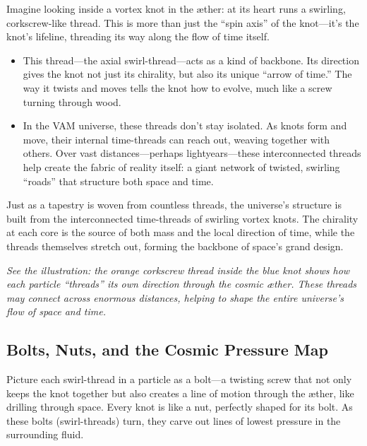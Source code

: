 Imagine looking inside a vortex knot in the æther: at its heart runs a swirling, corkscrew-like thread. This is more than just the “spin axis” of the knot—it’s the knot’s lifeline, threading its way along the flow of time itself.


\begin{itemize}

\item
This thread—the axial swirl-thread—acts as a kind of backbone. Its direction gives the knot not just its chirality, but also its unique “arrow of time.” The way it twists and moves tells the knot how to evolve, much like a screw turning through wood.




\item
In the VAM universe, these threads don’t stay isolated. As knots form and move, their internal time-threads can reach out, weaving together with others. Over vast distances—perhaps lightyears—these interconnected threads help create the fabric of reality itself: a giant network of twisted, swirling “roads” that structure both space and time.




\end{itemize}

Just as a tapestry is woven from countless threads, the universe’s structure is built from the interconnected time-threads of swirling vortex knots. The chirality at each core is the source of both mass and the local direction of time, while the threads themselves stretch out, forming the backbone of space’s grand design.


\textit{See the illustration: the orange corkscrew thread inside the blue knot shows how each particle “threads” its own direction through the cosmic æther. These threads may connect across enormous distances, helping to shape the entire universe’s flow of space and time.}



\subsection*{Bolts, Nuts, and the Cosmic Pressure Map}

Picture each swirl-thread in a particle as a bolt—a twisting screw that not only keeps the knot together but also creates a line of motion through the æther, like drilling through space. Every knot is like a nut, perfectly shaped for its bolt. As these bolts (swirl-threads) turn, they carve out lines of lowest pressure in the surrounding fluid.


